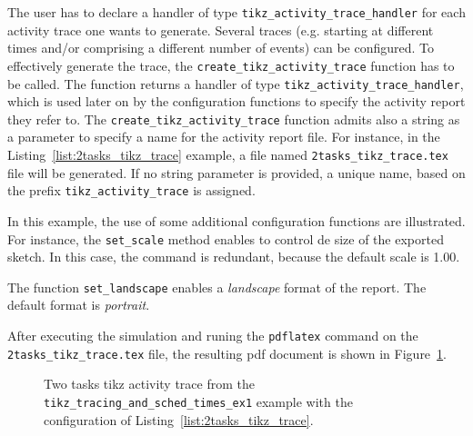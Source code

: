 The user has to declare a handler of type \texttt{tikz\_activity\_trace\_handler} for each activity trace one wants to generate.
Several traces (e.g. starting at different times and/or comprising a different number of events) can be configured.
%
To effectively generate the trace, the \texttt{create\_tikz\_activity\_trace} function has to be called.
The function returns a handler of type \texttt{tikz\_activity\_trace\_handler}, which is used later on by the
configuration functions to specify the activity report they refer to.
%
The \texttt{create\_tikz\_activity\_trace} function admits also a string as a parameter to specify a name for the activity report file.
For instance, in the Listing~\ref{list:2tasks_tikz_trace} example, a file named \texttt{2tasks\_tikz\_trace.tex} file will be generated.
If no string parameter is provided, a unique name, based on the prefix \texttt{tikz\_activity\_trace} is assigned.

In this example, the use of some additional configuration functions are illustrated.
For instance, the \texttt{set\_scale} method enables to control de size of the exported sketch.
In this case, the command is redundant, because the default scale is 1.00.

The function \texttt{set\_landscape} enables a \emph{landscape} format of the report.
The default format is \emph{portrait}.

After executing the simulation and runing the \texttt{pdflatex} command on the \texttt{2tasks\_tikz\_trace.tex} file,
the resulting pdf document is shown in Figure~\ref{fig:2tasks_tikz_trace}.
\begin{figure}[htbp]
\centering
\caption{Two tasks tikz activity trace from the \texttt{tikz\_tracing\_and\_sched\_times\_ex1} example with the configuration of Listing~\ref{list:2tasks_tikz_trace}.} 
\label{fig:2tasks_tikz_trace}
\end{figure}

